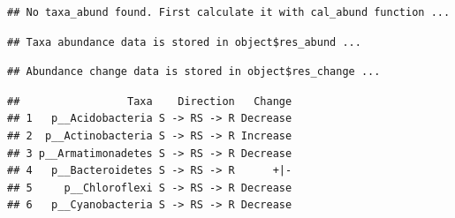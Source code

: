 \documentclass[
]{book}
\newenvironment{Shaded}{\begin{snugshade}}{\end{snugshade}}
\newcommand{\AttributeTok}[1]{\textcolor[rgb]{0.77,0.63,0.00}{#1}}
\newcommand{\CommentTok}[1]{\textcolor[rgb]{0.56,0.35,0.01}{\textit{#1}}}
\newcommand{\ConstantTok}[1]{\textcolor[rgb]{0.00,0.00,0.00}{#1}}
\newcommand{\FloatTok}[1]{\textcolor[rgb]{0.00,0.00,0.81}{#1}}
\newcommand{\FunctionTok}[1]{\textcolor[rgb]{0.00,0.00,0.00}{#1}}
\newcommand{\NormalTok}[1]{#1}
\newcommand{\OtherTok}[1]{\textcolor[rgb]{0.56,0.35,0.01}{#1}}
\newcommand{\SpecialCharTok}[1]{\textcolor[rgb]{0.00,0.00,0.00}{#1}}
\newcommand{\StringTok}[1]{\textcolor[rgb]{0.31,0.60,0.02}{#1}}
\begin{document}
\begin{Shaded}
\end{Shaded}

\begin{verbatim}
## No taxa_abund found. First calculate it with cal_abund function ...
\end{verbatim}

\begin{verbatim}
## Taxa abundance data is stored in object$res_abund ...
\end{verbatim}

\begin{verbatim}
## Abundance change data is stored in object$res_change ...
\end{verbatim}

\begin{Shaded}
\end{Shaded}

\begin{verbatim}
##                 Taxa    Direction   Change
## 1   p__Acidobacteria S -> RS -> R Decrease
## 2  p__Actinobacteria S -> RS -> R Increase
## 3 p__Armatimonadetes S -> RS -> R Decrease
## 4   p__Bacteroidetes S -> RS -> R      +|-
## 5     p__Chloroflexi S -> RS -> R Decrease
## 6   p__Cyanobacteria S -> RS -> R Decrease
\end{verbatim}

\begin{Shaded}
\end{Shaded}
\end{document}
